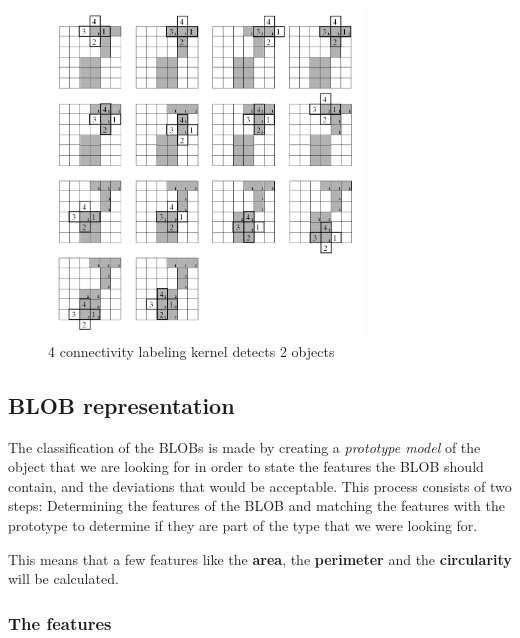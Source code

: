 \begin{figure}[htbp]
\centering
\includegraphics[width=0.75\textwidth]{Pictures/Theory/4connec_kernel.png}
\caption{4 connectivity labeling kernel detects 2 objects}
\label{fig:4connecK}
\end{figure}

\subsection{BLOB representation}
The classification of the BLOBs is made by creating a \textit{prototype model} of the object that we are looking for in order to state the features the BLOB should contain, and the deviations that would be acceptable. This process consists of two steps: Determining the features of the BLOB and matching the features with the prototype to determine if they are part of the type that we were looking for.

This means that a few features like the \textbf{area}, the \textbf{perimeter} and the \textbf{circularity} will be calculated.
\subsubsection{The features}

